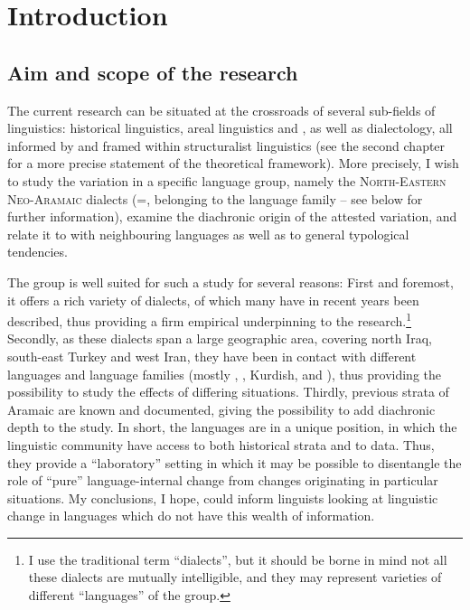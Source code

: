\chapter{Introduction}
\section{Aim and scope of the research}

The current research can be situated at the crossroads of several sub-fields of linguistics: historical linguistics, areal linguistics and , as well as dialectology, all informed by  and framed within structuralist linguistics (see the second chapter for a more precise statement of the theoretical framework).  More precisely, I wish to study the variation in a specific language group, namely the \textsc{North-Eastern Neo-Aramaic} dialects (=, belonging to the  language family -- see below for further information), examine the diachronic origin of the attested variation, and relate it to  with neighbouring languages as well as to general typological tendencies.

The  group is well suited for such a study for several reasons: First and foremost, it offers a rich variety of dialects, of  which many have in recent years been described, thus providing a firm empirical underpinning to the research.\footnote{I use the traditional term \enquote{dialects}, but it should be borne in mind not all these dialects are mutually intelligible, and they may represent varieties of different \enquote{languages} of the  group.} Secondly, as these dialects span a large geographic area, covering north Iraq, south-east Turkey and west Iran, they have been in contact with different languages and language families (mostly , , Kurdish,  and ), thus providing the possibility to study the effects of differing  situations. Thirdly, previous strata of Aramaic are known and documented, giving the possibility to add diachronic depth to the study. In short, the  languages are in a unique position, in which the linguistic community have access to both historical strata and to  data. Thus, they provide  a \enquote{laboratory} setting in which it may be possible to disentangle the role of \enquote{pure} language-internal change from changes originating in particular  situations. My conclusions, I hope, could inform linguists looking at linguistic change in languages which do not have this wealth of information.

